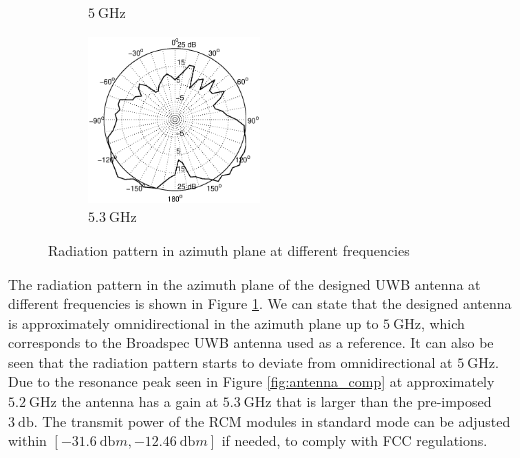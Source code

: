 \documentclass[a4paper]{article}        %
\begin{document}
\begin{figure}[H]
\begin{subfigure}{0.5\textwidth}
			\caption{$\SI{5}{\giga\hertz}$}
		\end{subfigure}
		\begin{subfigure}{\textwidth}
		\centering
			\includegraphics[width=0.5\textwidth]{images/antenna/radpat_azi_5_3G}
			\caption{$\SI{5.3}{\giga\hertz}$}
		\end{subfigure}
		\caption{Radiation pattern in azimuth plane at different frequencies}
		\label{fig:ant_radpat}
		\end{figure}

		The radiation pattern in the azimuth plane of the designed UWB antenna at different frequencies is shown in Figure \ref{fig:ant_radpat}. We can state that the designed antenna is approximately omnidirectional in the azimuth plane up to $\SI{5}{\giga\hertz}$, which corresponds to the Broadspec UWB antenna used as a reference. It can also be seen that the radiation pattern starts to deviate from omnidirectional at $\SI{5}{\giga\hertz}$. Due to the resonance peak seen in Figure \ref{fig:antenna_comp} at approximately $\SI{5.2}{\giga\hertz}$ the antenna has a gain at $\SI{5.3}{\giga\hertz}$ that is larger than the pre-imposed $\SI{3}{\decibel}$. The transmit power of the RCM modules in standard mode can be adjusted within $[\SI{-31.6}{\decibel}m , \SI{-12.46}{\decibel}m]$ if needed, to comply with FCC regulations.\\\\
		
\end{document}
